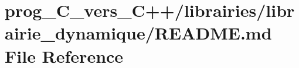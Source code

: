 \hypertarget{prog__C__vers__C_09_09_2librairies_2librairie__dynamique_2README_8md}{}\section{prog\+\_\+\+C\+\_\+vers\+\_\+\+C++/librairies/librairie\+\_\+dynamique/\+R\+E\+A\+D\+ME.md File Reference}
\label{prog__C__vers__C_09_09_2librairies_2librairie__dynamique_2README_8md}
